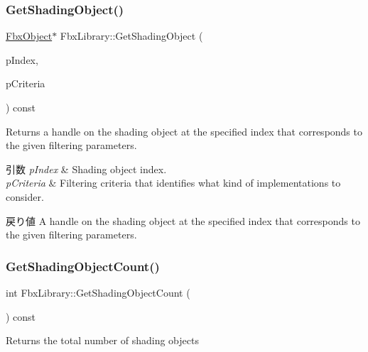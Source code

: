 \subsubsection{\texorpdfstring{Get\+Shading\+Object()}{GetShadingObject()}\hspace{0.1cm}{\footnotesize\ttfamily [2/2]}}
{\footnotesize\ttfamily \hyperlink{class_fbx_object}{Fbx\+Object}$\ast$ Fbx\+Library\+::\+Get\+Shading\+Object (\begin{DoxyParamCaption}\item[{int}]{p\+Index,  }\item[{const \hyperlink{class_fbx_implementation_filter}{Fbx\+Implementation\+Filter} \&}]{p\+Criteria }\end{DoxyParamCaption}) const}

Returns a handle on the shading object at the specified index that corresponds to the given filtering parameters. 
\begin{DoxyParams}{引数}
{\em p\+Index} & Shading object index. \\
\hline
{\em p\+Criteria} & Filtering criteria that identifies what kind of implementations to consider. \\
\hline
\end{DoxyParams}
\begin{DoxyReturn}{戻り値}
A handle on the shading object at the specified index that corresponds to the given filtering parameters. 
\end{DoxyReturn}
\mbox{\label{class_fbx_library_a0b5b034aeeb0d6a0f671fa4020ea1e07}} 
\subsubsection{\texorpdfstring{Get\+Shading\+Object\+Count()}{GetShadingObjectCount()}\hspace{0.1cm}{\footnotesize\ttfamily [1/2]}}
{\footnotesize\ttfamily int Fbx\+Library\+::\+Get\+Shading\+Object\+Count (\begin{DoxyParamCaption}\item[{void}]{ }\end{DoxyParamCaption}) const}



Returns the total number of shading objects 

